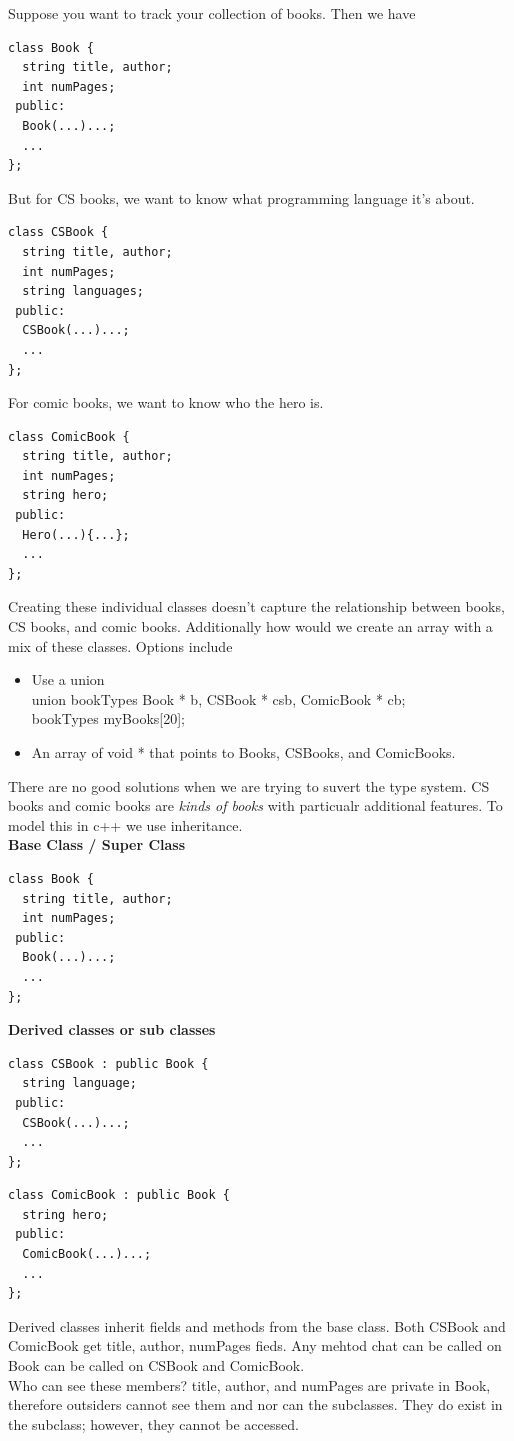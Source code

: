 \documentclass[english, 11pt]{article}
\begin{document}
Suppose you want to track your collection of books. Then we have
\begin{lstlisting}
class Book {
  string title, author;
  int numPages;
 public:
  Book(...)...;
  ...
};
\end{lstlisting}
But for CS books, we want to know what programming language it's about.
\begin{lstlisting}
class CSBook {
  string title, author;
  int numPages;
  string languages;
 public:
  CSBook(...)...;
  ...
};
\end{lstlisting}
For comic books, we want to know who the hero is.
\begin{lstlisting}
class ComicBook {
  string title, author;
  int numPages;
  string hero;
 public:
  Hero(...){...};
  ...
};
\end{lstlisting}
Creating these individual classes doesn't capture the relationship between books, CS books, and comic books. Additionally how would we create an array with a mix of these classes. Options include
\begin{itemize}
  \item Use a union \\ {\ttfamily union bookTypes {Book * b, CSBook * csb, ComicBook * cb}; \\bookTypes myBooks[20];}
  \item An array of {\ttfamily void *} that points to Books, CSBooks, and ComicBooks.
\end{itemize}
There are no good solutions when we are trying to suvert the type system. CS books and comic books are \textit{kinds of books} with particualr additional features. To model this in {\ttfamily c++} we use inheritance. \\
\textbf{Base Class / Super Class}
\begin{lstlisting}
class Book {
  string title, author;
  int numPages;
 public:
  Book(...)...;
  ...
};
\end{lstlisting}

\textbf{Derived classes or sub classes}
\begin{lstlisting}
class CSBook : public Book {
  string language;
 public:
  CSBook(...)...;
  ...
};
\end{lstlisting}
\begin{lstlisting}
class ComicBook : public Book {
  string hero;
 public:
  ComicBook(...)...;
  ...
};
\end{lstlisting}
Derived classes inherit fields and methods from the base class. Both CSBook and ComicBook get title, author, numPages fieds. Any mehtod chat can be called on Book can be called on CSBook and ComicBook. \\
Who can see these members? title, author, and numPages are private in Book, therefore outsiders cannot see them and nor can the subclasses. They do exist in the subclass; however, they cannot be accessed. \\
\end{document}
